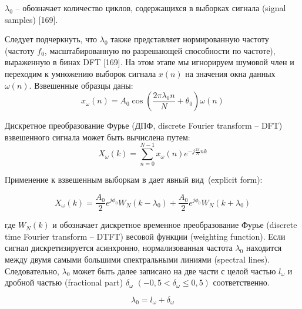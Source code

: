 $\lambda_0$ – обозначает количество циклов, содержащихся в выборках сигнала (signal samples) [169].

Следует подчеркнуть, что $\lambda_0$ также представляет нормированную частоту (частоту $f_0$, масштабированную по разрешающей способности по частоте), выраженную в бинах DFT [169].
На этом этапе мы игнорируем шумовой член и переходим к умножению выборок сигнала $x(n)$ на значения окна данных $\omega(n)$.
Взвешенные образцы даны:
\begin{equation}
\label{eq:equation15}
x_\omega(n)=A_0 \cos(\frac{2 \pi \lambda_0 n}{N}+\theta_0)\omega(n)
\end{equation}

Дискретное преобразование Фурье (ДПФ, discrete Fourier transform – DFT) взвешенного сигнала может быть вычислена путем:
\begin{equation}
\label{eq:equation16}
X_\omega(k) = \sum_{n=0}^{N-1} x_\omega(n) e^{-j \frac{2 \pi}{N}nk}
\end{equation}

Применение  к взвешенным выборкам в  дает явный вид~(explicit form):

\begin{equation}
\label{eq:equation17}
X_\omega(k) = \frac{A_0}{2} e^{j\phi_0}W_N(k-\lambda_0)+\frac{A_0}{2}e^{j\phi_0}W_N(k+\lambda_0)
\end{equation}

где $W_N (k)$ и обозначает дискретное временное преобразование Фурье (discrete time Fourier transform – DTFT) весовой функции (weighting function). Если сигнал дискретизируется асинхронно, нормализованная частота $\lambda_0$ находится между двумя самыми большими спектральными линиями (spectral lines). Следовательно, $\lambda_0$  может быть далее записано на две части с целой частью $l_\omega$ и дробной частью (fractional part) $\delta_\omega$ $(-0,5<\delta_{\omega}\leq0,5)$ соответственно.

\begin{equation}
\label{eq:equation18}
\lambda_0 = l_\omega + \delta_\omega
\end{equation}

